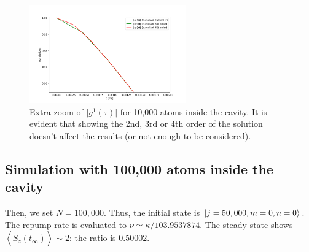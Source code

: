 \documentclass[11pt]{report}
\DeclarePairedDelimiter\ket{\lvert}{\rangle}
\begin{document}
\begin{figure}[h!]
\caption{Extra zoom of $\vert g^1(\tau) \vert$ for 10,000 atoms inside the cavity. It is evident that showing the 2nd, 3rd or 4th order of the solution doesn't affect the results (or not enough to be considered).}
\centering
\includegraphics[width=0.6\textwidth]{10k_234_g1_zoom_2}
\end{figure}

\pagebreak
\subsection{Simulation with 100,000 atoms inside the cavity}

Then, we set $N=100,000$. Thus, the initial state is $\ket{j=50,000, m=0, n=0}$. The repump rate is evaluated to $\nu \simeq \kappa / 103.9537874$. The steady state shows $\left\langle \hat{S}_z(t_\infty) \right\rangle \sim 2$: the ratio is $0.50002$.
\end{document}

